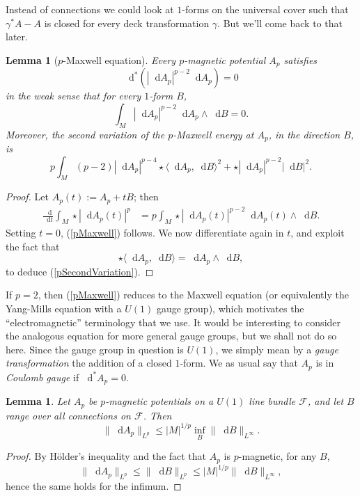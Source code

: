 \documentclass[reqno,11pt]{amsart}
\newcommand*\dif{\mathop{}\!\mathrm{d}}
\newcommand{\dfn}[1]{\emph{#1}\index{#1}}
\newtheorem{lemma}[theorem]{Lemma}
\theoremstyle{definition}
\numberwithin{equation}{section}
\begin{document}
Instead of connections we could look at $1$-forms on the universal cover such that $\gamma^* A - A$ is closed for every deck transformation $\gamma$.
But we'll come back to that later.

\begin{lemma}[$p$-Maxwell equation]
Every $p$-magnetic potential $A_p$ satisfies
\begin{equation}\label{pMaxwell}
	\dif^*(|\dif A_p|^{p - 2} \dif A_p) = 0
\end{equation}
in the weak sense that for every $1$-form $B$,
$$\int_M |\dif A_p|^{p - 2} \dif A_p \wedge \dif B = 0.$$
Moreover, the second variation of the $p$-Maxwell energy at $A_p$, in the direction $B$, is
\begin{equation}\label{pSecondVariation}
p \int_M (p - 2) |\dif A_p|^{p - 4} \star \langle \dif A_p, \dif B\rangle^2 + \star |\dif A_p|^{p - 2} |\dif B|^2.
\end{equation}
\end{lemma}
\begin{proof}
Let $A_p(t) := A_p + tB$; then 
\begin{align*}
	\frac{\dif}{\dif t} \int_M \star |\dif A_p(t)|^p
	&= p \int_M \star |\dif A_p(t)|^{p - 2} \dif A_p(t) \wedge \dif B.
\end{align*}
Setting $t = 0$, (\ref{pMaxwell}) follows.
We now differentiate again in $t$, and exploit the fact that
$$\star \langle \dif A_p, \dif B\rangle = \dif A_p \wedge \dif B,$$
to deduce (\ref{pSecondVariation}).
\end{proof}

If $p = 2$, then (\ref{pMaxwell}) reduces to the Maxwell equation (or equivalently the Yang-Mills equation with a $U(1)$ gauge group), which motivates the ``electromagnetic'' terminology that we use.
It would be interesting to consider the analogous equation for more general gauge groups, but we shall not do so here.
Since the gauge group in question is $U(1)$, we simply mean by a \dfn{gauge transformation} the addition of a closed $1$-form.
We as usual say that $A_p$ is in \dfn{Coulomb gauge} if $\dif^* A_p = 0$.

\begin{lemma}
Let $A_p$ be $p$-magnetic potentials on a $U(1)$ line bundle $\mathscr F$, and let $B$ range over all connections on $\mathscr F$.
Then 
\begin{equation}\label{infinity magnetic rules p magnetic}
	\|\dif A_p\|_{L^p} \leq |M|^{1/p} \inf_B \|\dif B\|_{L^\infty}.
\end{equation}
\end{lemma}
\begin{proof}
By H\"older's inequality and the fact that $A_p$ is $p$-magnetic, for any $B$,
$$\|\dif A_p\|_{L^p} \leq \|\dif B\|_{L^p} \leq |M|^{1/p} \|\dif B\|_{L^\infty},$$
hence the same holds for the infimum.
\end{proof}
\end{document}
